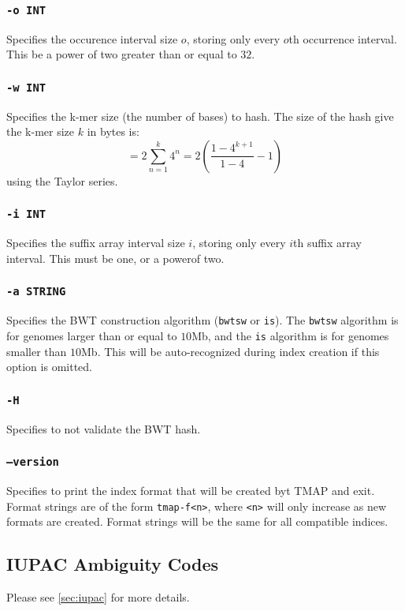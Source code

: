 \documentclass[a4paper,12pt]{book}
\newcommand{\TT}[1]{{\tt #1}} %
\begin{document}
\subsubsection{\TT{-o INT}}
Specifies the occurence interval size $o$, storing only every $o$th occurrence interval.
This be a power of two greater than or equal to $32$.

\subsubsection{\TT{-w INT}}
Specifies the k-mer size (the number of bases) to hash.
The size of the hash give the k-mer size $k$ in bytes is:
\[
= 2 \sum_{n=1}^{k} 4^{n}
= 2 \left(\frac{1 - 4^{k+1}}{1-4} - 1\right)
\]
using the Taylor series.

\subsubsection{\TT{-i INT}}
Specifies the suffix array interval size $i$, storing only every $i$th suffix array interval.
This must be one, or a powerof two.

\subsubsection{\TT{-a STRING}}
Specifies the BWT construction algorithm (\TT{bwtsw} or \TT{is}).
The \TT{bwtsw} algorithm is for genomes larger than or equal to $10$Mb, and the \TT{is} algorithm is for genomes smaller than $10$Mb.
This will be auto-recognized during index creation if this option is omitted.

\subsubsection{\TT{-H}}
Specifies to not validate the BWT hash.

\subsubsection{\TT{--version}}
Specifies to print the index format that will be created byt TMAP and exit.
Format strings are of the form \TT{tmap-f<n>}, where \TT{<n>} will only increase as new formats are created.
Format strings will be the same for all compatible indices.
\subsection{IUPAC Ambiguity Codes}
Please see \autoref{sec:iupac} for more details. 
\end{document}
